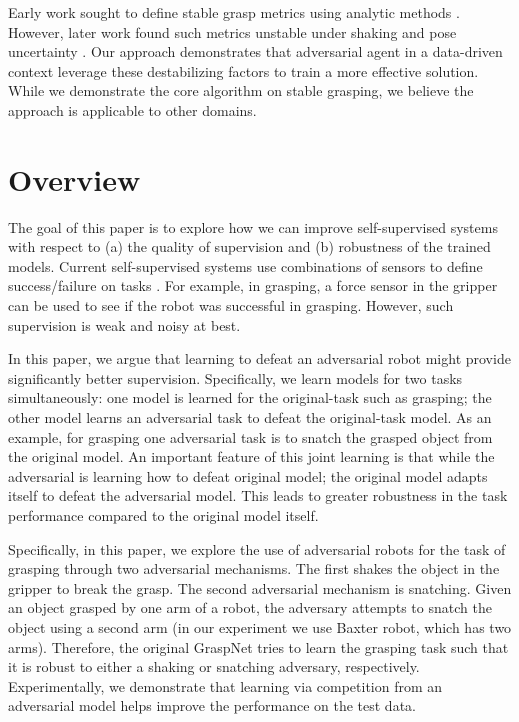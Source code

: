 \documentclass[letterpaper, 10 pt, conference]{ieeeconf}  %
\begin{document}
Early work sought to define stable grasp metrics using analytic methods \cite{ferrari1992planning}. However, later work found such metrics unstable under shaking \cite{balasubramanian2012physical} and pose uncertainty \cite{weisz2012pose, kim2013physically}.  Our approach demonstrates that adversarial agent in a data-driven context leverage these destabilizing factors to train a more effective solution. While we demonstrate the core algorithm on stable grasping, we believe the approach is applicable to other domains.
\section{Overview}
The goal of this paper is to explore how we can improve self-supervised systems with respect to (a) the quality of supervision and (b) robustness of the trained models. Current self-supervised systems use combinations of sensors to define success/failure on tasks \cite{lenz2015deep, pinto2016supersizing, levine2016end, levine2016learning}. For example, in grasping, a force sensor in the gripper can be used to see if the robot was successful in grasping. However, such supervision is weak and noisy at best. 

In this paper, we argue that learning to defeat an adversarial robot might provide significantly better supervision. Specifically, we learn models for two tasks simultaneously: one model is learned for the original-task such as grasping; the other model learns an adversarial task to defeat the original-task model. As an example, for grasping one adversarial task is to snatch the grasped object from the original model. An important feature of this joint learning is that while the adversarial is learning how to defeat original model; the original model adapts itself to defeat the adversarial model. This leads to greater robustness in the task performance compared to the original model itself. 

Specifically, in this paper, we explore the use of adversarial robots for the task of grasping through two adversarial mechanisms. The first shakes the object in the gripper to break the grasp. The second adversarial mechanism is snatching. Given an object grasped by one arm of a robot, the adversary attempts to snatch the object using a second arm (in our experiment we use Baxter robot, which has two arms). Therefore, the original GraspNet tries to learn the grasping task such that it is robust to either a shaking or snatching adversary, respectively.
Experimentally, we demonstrate that learning via competition from an adversarial model helps improve the performance on the test data. 
\end{document}
